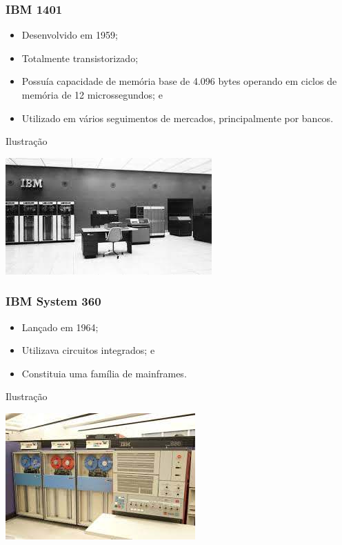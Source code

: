 \documentclass[aspectratio=169]{beamer} %
\begin{document}
\begin{frame}
	\frametitle{IBM 1401}
	
	\begin{itemize}
		\item Desenvolvido em 1959; 
		\item Totalmente transistorizado;
		\item Possuía capacidade de memória base de 4.096 bytes operando em ciclos de memória de 12 microssegundos; e
		\item Utilizado em vários seguimentos de mercados, principalmente por bancos.
	\end{itemize}\vfill
	
	\begin{exampleblock}{Ilustra\c cão}
		\begin{center}
			\includegraphics[scale=0.5]{img/ibm1401}
		\end{center}
	\end{exampleblock}
\end{frame}

\begin{frame}
	\frametitle{IBM System 360}
	
	\begin{itemize}
		\item Lançado em 1964; 
		\item Utilizava circuitos integrados; e 
		\item Constituia uma família de mainframes.
	\end{itemize}\vfill
	
	\begin{exampleblock}{Ilustra\c cão}
		\begin{center}
			\includegraphics[scale=0.5]{img/ibm360}
		\end{center}
	\end{exampleblock}
\end{frame}
\end{document}
